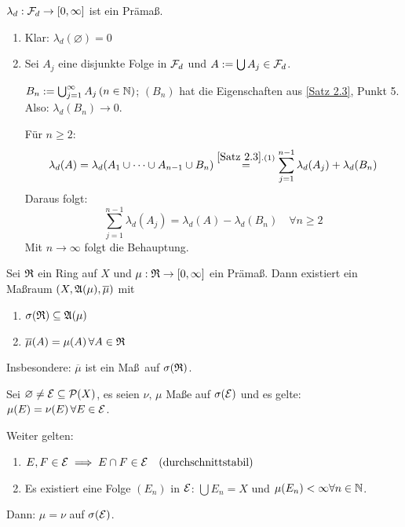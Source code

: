 \documentclass[a4paper,twoside,DIV15,BCOR12mm,chapterprefix=true,headings=onelinechapter]{scrbook}
\begin{document}
\begin{satz}
\label{Satz 2.4}
\(\lambda_{d}:\mathcal{F}_{d}\to[0,\infty]\) ist ein Pr\"ama\ss .
\end{satz}
\begin{beweis}
\begin{enumerate}
\item Klar: \(\lambda_{d}(\varnothing)=0\)
\item Sei \(A_{j}\) eine disjunkte Folge in \(\mathcal{F}_{d}\) und \(A:=\bigcup{A_{j}}\in\mathcal{F}_{d}\).

\(B_{n}:=\bigcup_{j=1}^{\infty}{A_{j}}\,(n\in\mathbb{N})\); \((B_{n})\) hat die
Eigenschaften aus \ref{Satz 2.3}, Punkt 5. Also: \(\lambda_{d}(B_{n})\to 0\).

F\"ur \(n\geq 2\):
\[
\lambda_{d}(A)=\lambda_{d}(A_{1}\cup\cdots\cup A_{n-1}\cup B_{n})\overset{\ref{Satz 2.3}.(1)}{=}\sum_{j=1}^{n-1}{\lambda_{d}(A_{j})}+\lambda_{d}(B_{n})
\]
Daraus folgt: 
\[
\sum_{j=1}^{n-1}{\lambda_{d}(A_{j})}=\lambda_{d}(A)-\lambda_{d}(B_{n})\quad\forall n\geq 2
\]
Mit \(n\to\infty\) folgt die Behauptung.
\end{enumerate}
\end{beweis}

\begin{satz}
\label{Satz 2.5}
Sei \(\mathfrak{R}\) ein Ring auf \(X\) und \(\mu:\mathfrak{R}\to[0,\infty]\) ein Pr\"ama\ss. Dann
existiert ein Ma\ss raum \((X,\mathfrak{A}(\mu),\overline{\mu})\) mit
\begin{enumerate}
\item \(\sigma(\mathfrak{R})\subseteq\mathfrak{A}(\mu)\)
\item \(\overline{\mu}(A)=\mu(A)\,\forall A\in\mathfrak{R}\)
\end{enumerate}
Insbesondere: \(\overline{\mu}\) ist ein Ma\ss \ auf \(\sigma(\mathfrak{R})\).
\end{satz}

\begin{satz}[Eindeutigkeitssatz]
\label{Satz 2.6}
Sei \(\varnothing\neq\mathcal{E}\subseteq\mathcal{P}(X)\), es seien \(\nu,\,\mu\) Ma\ss e auf
\(\sigma(\mathcal{E})\) und es gelte: \(\mu(E)=\nu(E)\,\forall E\in\mathcal{E}\).

Weiter gelten:
\begin{enumerate}
\item \(E,F\in\mathcal{E}\implies E\cap F\in\mathcal{E}\quad\text{(durchschnittstabil)}\)
\item Es existiert eine Folge \((E_{n})\) in \(\mathcal{E}\): \(\bigcup{E_{n}}=X\) und
\(\mu(E_{n})<\infty\forall n\in\mathbb{N}\).
\end{enumerate}
Dann: \(\mu=\nu\) auf \(\sigma(\mathcal{E})\).
\end{satz}
\end{document}
